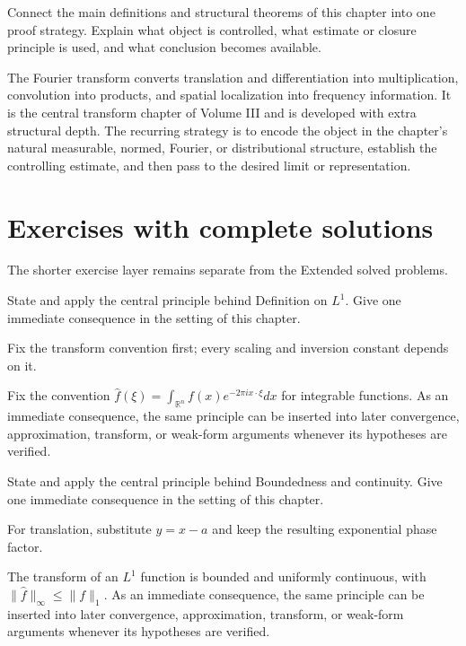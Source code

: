 \begin{problem}\label{prob:iii11-problem-12}
Connect the main definitions and structural theorems of this chapter into one proof strategy. Explain what object is controlled, what estimate or closure principle is used, and what conclusion becomes available.
\end{problem}
\begin{solution}
The Fourier transform converts translation and differentiation into multiplication, convolution into products, and spatial localization into frequency information. It is the central transform chapter of Volume III and is developed with extra structural depth. The recurring strategy is to encode the object in the chapter's natural measurable, normed, Fourier, or distributional structure, establish the controlling estimate, and then pass to the desired limit or representation.
\end{solution}
\section{Exercises with complete solutions}
The shorter exercise layer remains separate from the Extended solved problems.

\begin{exercise}\label{exr:iii11-01}
State and apply the central principle behind Definition on $L^1$. Give one immediate consequence in the setting of this chapter.
\end{exercise}
\begin{hint}
Fix the transform convention first; every scaling and inversion constant depends on it.
\end{hint}
\begin{solution}
Fix the convention $\widehat f(\xi)=\int_{\mathbb R^n}f(x)e^{-2\pi i x\cdot\xi}dx$ for integrable functions. As an immediate consequence, the same principle can be inserted into later convergence, approximation, transform, or weak-form arguments whenever its hypotheses are verified.
\end{solution}

\begin{exercise}\label{exr:iii11-02}
State and apply the central principle behind Boundedness and continuity. Give one immediate consequence in the setting of this chapter.
\end{exercise}
\begin{hint}
For translation, substitute \(y=x-a\) and keep the resulting exponential phase factor.
\end{hint}
\begin{solution}
The transform of an $L^1$ function is bounded and uniformly continuous, with $\|\widehat f\|_\infty\le\|f\|_1$. As an immediate consequence, the same principle can be inserted into later convergence, approximation, transform, or weak-form arguments whenever its hypotheses are verified.
\end{solution}

